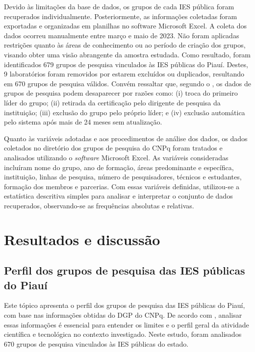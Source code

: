 \documentclass[portuguese]{textolivre}
\begin{document}
Devido às limitações da base de dados, os grupos de cada IES pública foram recuperados individualmente. Posteriormente, as informações coletadas foram exportadas e organizadas em planilhas no software Microsoft Excel. A coleta dos dados ocorreu manualmente entre março e maio de 2023. Não foram aplicadas restrições quanto às áreas de conhecimento ou ao período de criação dos grupos, visando obter uma visão abrangente da amostra estudada. Como resultado, foram identificados 679 grupos de pesquisa vinculados às IES públicas do Piauí. Destes, 9 laboratórios foram removidos por estarem excluídos ou duplicados, resultando em 670 grupos de pesquisa válidos. Convém ressaltar que, segundo o \textcite{cnpq2023b}, os dados de grupos de pesquisa podem desaparecer por razões como: (i) troca do primeiro líder do grupo; (ii) retirada da certificação pelo dirigente de pesquisa da instituição; (iii) exclusão do grupo pelo próprio líder; e (iv) exclusão automática pelo sistema após mais de 24 meses sem atualização.

Quanto às variáveis adotadas e aos procedimentos de análise dos dados, os dados coletados no diretório dos grupos de pesquisa do CNPq foram tratados e analisados utilizando o \textit{software} Microsoft Excel. As variáveis consideradas incluíram nome do grupo, ano de formação, áreas predominante e específica, instituição, linhas de pesquisa, número de pesquisadores, técnicos e estudantes, formação dos membros e parcerias. Com essas variáveis definidas, utilizou-se a estatística descritiva simples para analisar e interpretar o conjunto de dados recuperados, observando-se as frequências absolutas e relativas.


\section{Resultados e discussão}\label{sec-formato}

\subsection{Perfil dos grupos de pesquisa das IES públicas do Piauí}\label{sec-modelo}
Este tópico apresenta o perfil dos grupos de pesquisa das IES públicas do Piauí, com base nas informações obtidas do DGP do CNPq. De acordo com \textcite{cezar2018}, analisar essas informações é essencial para entender os limites e o perfil geral da atividade científica e tecnológica no contexto investigado. Neste estudo, foram analisados 670 grupos de pesquisa vinculados às IES públicas do estado.
\end{document}
